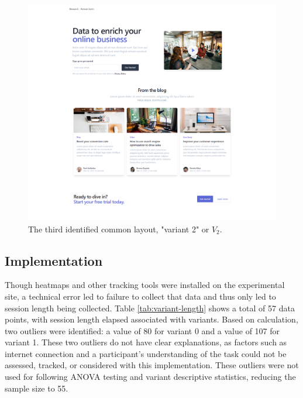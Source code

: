 \documentclass[conference]{IEEEtran}
\begin{document}
\begin{figure}[h]
\centering
\label{fig:variant2}
\includegraphics[width=\columnwidth]{media/vtc5qYP2r8Ut.png}
\caption{The third identified common layout, "variant 2" or \(V_2\).}
\end{figure}

\subsection{Implementation}

Though heatmaps and other tracking tools were installed on the experimental site, a technical error led to failure to collect that data and thus only led to session length being collected. Table \ref{tab:variant-length} shows a total of 57 data points, with session length elapsed associated with variants. Based on calculation, two outliers were identified: a value of 80 for variant 0 and a value of 107 for variant 1. These two outliers do not have clear explanations, as factors such as internet connection and a participant's understanding of the task could not be assessed, tracked, or considered with this implementation. These outliers were not used for following ANOVA testing and variant descriptive statistics, reducing the sample size to 55.
\end{document}
